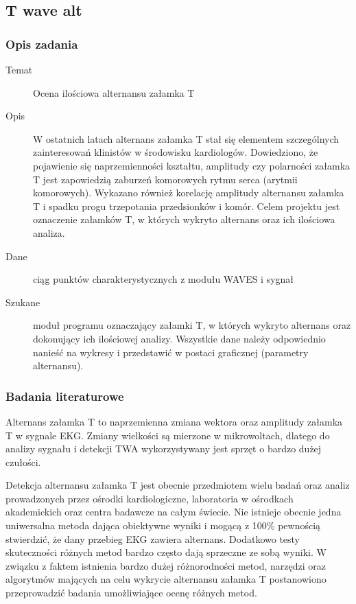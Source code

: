 \documentclass[a4paper, 11pt]{article}
\begin{document}
\subsection{T wave alt}
\label{sec:t_wave_alt}

\subsubsection{Opis zadania}
\label{sec::t_wave_alt:desc}

\begin{description}
\item[Temat] Ocena ilościowa alternansu załamka T
\item[Opis] W ostatnich latach alternans załamka T stał się
 elementem szczególnych zainteresowań klinistów w środowisku kardiologów.
 Dowiedziono, że pojawienie się naprzemienności kształtu, amplitudy czy
 polarności załamka T jest zapowiedzią zaburzeń komorowych rytmu serca 
(arytmii komorowych). Wykazano również korelację amplitudy alternansu 
załamka T i spadku progu trzepotania przedsionków i komór. Celem projektu
 jest oznaczenie załamków T, w których wykryto alternans oraz ich ilościowa analiza.
\item[Dane] ciąg punktów charakterystycznych z modułu WAVES i sygnał 
\item[Szukane] moduł programu oznaczający załamki T, w których wykryto alternans
 oraz dokonujący ich ilościowej analizy. Wszystkie dane należy odpowiednio nanieść
 na wykresy i przedstawić w postaci graficznej (parametry alternansu).
\end{description}

\subsubsection{Badania literaturowe}
\label{sec::t_wave_alt:papers}
Alternans załamka T to naprzemienna zmiana wektora oraz amplitudy załamka T w sygnale EKG. Zmiany wielkości są mierzone w mikrowoltach, dlatego do analizy sygnału i detekcji TWA wykorzystywany jest sprzęt o bardzo dużej czułości. 

Detekcja alternansu załamka T jest obecnie przedmiotem wielu badań oraz analiz prowadzonych przez ośrodki kardiologiczne, laboratoria w ośrodkach akademickich oraz centra badawcze na całym świecie. Nie istnieje obecnie jedna uniwersalna metoda dająca obiektywne wyniki i mogącą z 100\% pewnością stwierdzić, że dany przebieg EKG zawiera alternans. Dodatkowo testy skuteczności różnych metod bardzo często dają sprzeczne ze sobą wyniki. W związku z faktem istnienia bardzo dużej różnorodności metod, narzędzi oraz algorytmów mających na celu wykrycie alternansu załamka T postanowiono przeprowadzić badania umożliwiające ocenę różnych metod.
\end{document}

